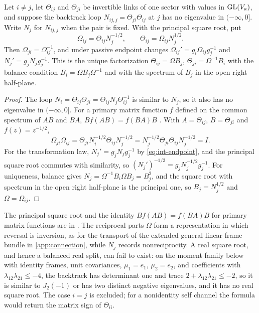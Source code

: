 Let $i\neq j$, let $\Theta_{ij}$ and $\Theta_{ji}$ be invertible links of one sector with values in $\mathrm{GL}(V_a)$, and suppose the backtrack loop $N_{ij,j}=\Theta_{ji}\Theta_{ij}$ at $j$ has no eigenvalue in $(-\infty,0]$. Write $N_j$ for $N_{ij,j}$ when the pair is fixed. With the principal square root, put
\begin{equation}
\Omega_{ij}=\Theta_{ij}N_j^{-1/2},
\qquad
\Theta_{ij}=\Omega_{ij}N_j^{1/2}.
\label{eq:int-reciprocal}
\end{equation}
Then $\Omega_{ji}=\Omega_{ij}^{-1}$, and under passive endpoint changes $\Omega_{ij}'=g_i\Omega_{ij}g_j^{-1}$ and $N_j'=g_jN_jg_j^{-1}$. This is the unique factorization $\Theta_{ij}=\Omega B_j$, $\Theta_{ji}=\Omega^{-1}B_i$ with the balance condition $B_i=\Omega B_j\Omega^{-1}$ and with the spectrum of $B_j$ in the open right half-plane.
\begin{proof}
The loop $N_i=\Theta_{ij}\Theta_{ji}=\Theta_{ij}N_j\Theta_{ij}^{-1}$ is similar to $N_j$, so it also has no eigenvalue in $(-\infty,0]$. For a primary matrix function $f$ defined on the common spectrum of $AB$ and $BA$, $Bf(AB)=f(BA)B$ \citep[Chapter~1]{Higham2008}. With $A=\Theta_{ij}$, $B=\Theta_{ji}$ and $f(z)=z^{-1/2}$,
\begin{equation}
\Omega_{ji}\Omega_{ij}
=\Theta_{ji}N_i^{-1/2}\Theta_{ij}N_j^{-1/2}
=N_j^{-1/2}\Theta_{ji}\Theta_{ij}N_j^{-1/2}=I.
\end{equation}
For the transformation law, $N_j'=g_jN_jg_j^{-1}$ by \cref{eq:int-endpoint}, and the principal square root commutes with similarity, so $(N_j')^{-1/2}=g_jN_j^{-1/2}g_j^{-1}$. For uniqueness, balance gives $N_j=\Omega^{-1}B_i\Omega B_j=B_j^2$, and the square root with spectrum in the open right half-plane is the principal one, so $B_j=N_j^{1/2}$ and $\Omega=\Omega_{ij}$.
\end{proof}
The principal square root and the identity $Bf(AB)=f(BA)B$ for primary matrix functions are in \citet[Sections~1.7 and~1.8]{Higham2008}. The reciprocal parts $\Omega$ form a representation in which reversal is inversion, as for the transport of the extended general linear frame bundle in \cref{app:connection}, while $N_j$ records nonreciprocity. A real square root, and hence a balanced real split, can fail to exist: on the moment family below with identity frames, unit covariances, $\mu_1=e_1$, $\mu_2=e_2$, and coefficients with $\lambda_{12}\lambda_{21}\le-4$, the backtrack has determinant one and trace $2+\lambda_{12}\lambda_{21}\le-2$, so it is similar to $J_2(-1)$ or has two distinct negative eigenvalues, and it has no real square root. The case $i=j$ is excluded; for a nonidentity self channel the formula would return the matrix sign of $\Theta_{ii}$.

